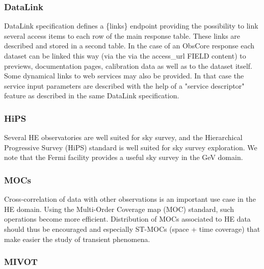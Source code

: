 \documentclass[11pt,a4paper]{ivoa}
\begin{document}
\subsubsection{DataLink}


DataLink specification \citep{2023ivoa.spec.1215B} defines a \{links\} endpoint providing the possibility to link several
access items to each row of the main response table. These links are described and stored in a second
table. In the case of an ObsCore response each dataset can be linked this way (via the via the access\_url
FIELD content) to previews, documentation pages, calibration data as well as to the dataset itself.
Some dynamical links to web services may also be provided. In that case the service input parameters are
described with the help of a "service descriptor" feature as described in the same DataLink specification.

\subsubsection{HiPS}

Several HE observatories are well suited for sky survey, and the Hierarchical Progressive Survey (HiPS) standard is well suited for sky survey exploration. We note that the Fermi facility provides a useful sky survey in the GeV domain.


\subsubsection{MOCs}

Cross-correlation of data with other observations is an important use case in the HE domain. Using the Multi-Order Coverage map (MOC) standard, such operations become more efficient. Distribution of MOCs associated to HE data should thus be encouraged and especially ST-MOCs (space + time coverage)
that make easier the study of transient phenomena.

\subsubsection{MIVOT}
\end{document}
